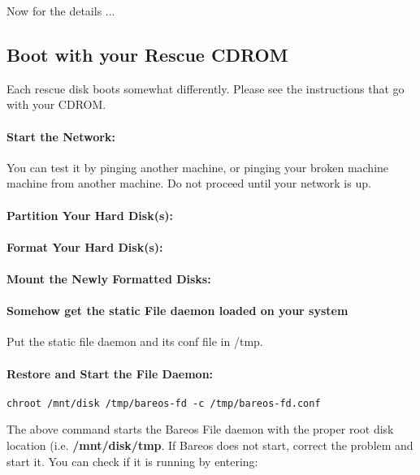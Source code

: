 Now for the details ...

\subsection{Boot with your Rescue CDROM}

Each rescue disk boots somewhat differently.  Please see the
instructions that go with your CDROM.


\paragraph*{Start the Network:}

\normalsize

You can test it by pinging another machine, or pinging your broken machine
machine from another machine. Do not proceed until your network is up.

\paragraph*{Partition Your Hard Disk(s):}

\paragraph*{Format Your Hard Disk(s):}

\paragraph*{Mount the Newly Formatted Disks:}


\paragraph*{Somehow get the static File daemon loaded on your system}
Put the static file daemon and its conf file in /tmp.

\paragraph*{Restore and Start the File Daemon:}
\footnotesize
\begin{verbatim}
chroot /mnt/disk /tmp/bareos-fd -c /tmp/bareos-fd.conf
\end{verbatim}
\normalsize

The above command starts the Bareos File daemon with the proper root disk
location (i.e. {\bf /mnt/disk/tmp}. If Bareos does not start, correct the
problem and start it. You can check if it is running by entering:

